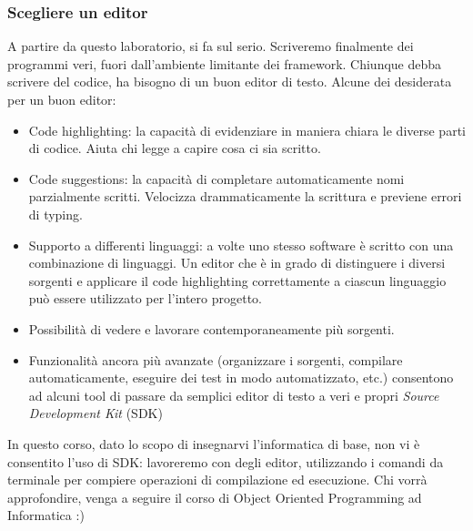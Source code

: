 \documentclass{beamer}
\begin{document}
\begin{frame}[fragile]
\frametitle{Scegliere un editor}
A partire da questo laboratorio, si fa sul serio. Scriveremo finalmente dei programmi veri, fuori dall'ambiente limitante dei framework. Chiunque debba scrivere del codice, ha bisogno di un buon editor di testo. Alcune dei desiderata per un buon editor:
\scriptsize{}
 \begin{itemize}
    \item Code highlighting: la capacità di evidenziare in maniera chiara le diverse parti di codice. Aiuta chi legge a capire cosa ci sia scritto.
    \item Code suggestions: la capacità di completare automaticamente nomi parzialmente scritti. Velocizza drammaticamente la scrittura e previene errori di typing.
    \item Supporto a differenti linguaggi: a volte uno stesso software è scritto con una combinazione di linguaggi. Un editor che è in grado di distinguere i diversi sorgenti e applicare il code highlighting correttamente a ciascun linguaggio può essere utilizzato per l'intero progetto.
    \item Possibilità di vedere e lavorare contemporaneamente più sorgenti.
    \item Funzionalità ancora più avanzate (organizzare i sorgenti, compilare automaticamente, eseguire dei test in modo automatizzato, etc.) consentono ad alcuni tool di passare da semplici editor di testo a veri e propri \textit{Source Development Kit} (SDK)
 \end{itemize}
\normalsize{}
In questo corso, dato lo scopo di insegnarvi l'informatica di base, non vi è consentito l'uso di SDK: lavoreremo con degli editor, utilizzando i comandi da terminale per compiere operazioni di compilazione ed esecuzione. Chi vorrà approfondire, venga a seguire il corso di Object Oriented Programming ad Informatica :)
\end{frame}
\end{document}
